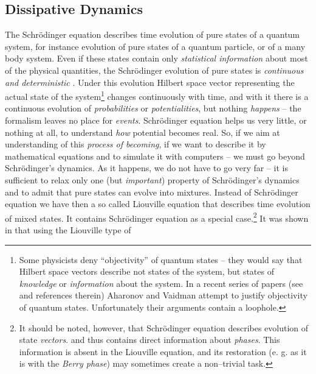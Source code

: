 \documentclass[12pt]{article}
\begin{document}
\subsection{Dissipative Dynamics}

The Schr\"odinger equation describes time evolution of pure states of a quantum
system,  for instance evolution of pure states of a quantum particle, 
 or of a many body system.  
Even if these states
contain only {\em statistical information} about most of the physical
 quantities,  the
Schr\"odinger evolution of pure states is {\em continuous and deterministic}
.  Under this evolution Hilbert space vector representing the actual state of
the system\footnote{Some physicists deny ``objectivity'' of quantum states
-- they would say that Hilbert space vectors describe not
states of the system,  but states of {\em knowledge} or {\em
information} about  the system.  In a recent series of
papers  (see \cite{aha} and references therein)
Aharonov and Vaidman \cite{aha}
attempt to justify
objectivity of quantum states.  Unfortunately their arguments contain
a loophole. } changes
continuously with time,  and with it there is a continuous evolution of {\em 
probabilities} or {\em potentialities},  but nothing {\em happens} -- the
formalism leaves no place for {\em events}.  Schr\"odinger equation helps us
very little,  or nothing at all,  to understand {\em how} potential becomes
real.  So,  if we aim at understanding of this {\em process of becoming},  if we
want to describe it by mathematical equations and to simulate it with
computers -- we must go beyond Schr\"odinger's dynamics.  As it happens,  we
do not have to go very far -- it is sufficient to relax only one  (but {\em 
important}) property of Schr\"odinger's dynamics and to admit that pure
states can evolve into mixtures.  Instead of Schr\"odinger equation we have
then a so called Liouville equation that describes time evolution of mixed
states.  It contains Schr\"odinger
equation as a special case.\footnote{
It should be noted,  however,  that Schr\"odinger equation
describes evolution of state {\em vectors}.  and thus contains direct
information about {\em phases}.  This information is absent in
the Liouville equation,  and its restoration  (e. g.  as it is with the
{\em Berry phase}) 
may sometimes create  a non--trivial task. }
It was shown in \cite{bla5} that using the Liouville type of
\end{document}
